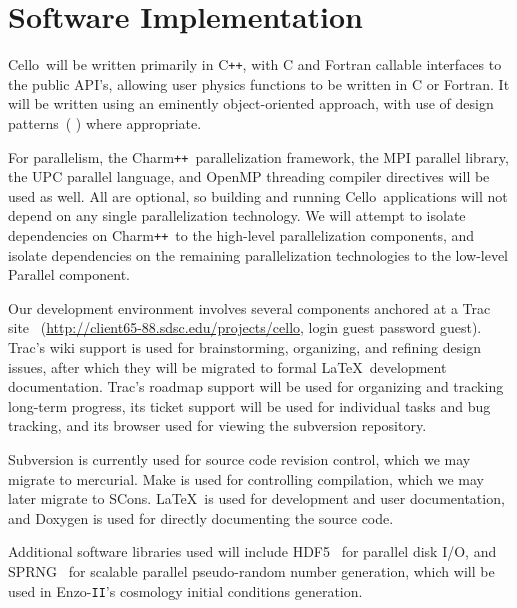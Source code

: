 \documentclass[11pt,letterpaper]{article}
\newcommand{\cello}{\textsf{Cello}}
\newcommand{\enzoii}{\textsf{Enzo}-\texttt{II}}
\newcommand{\pp}{\texttt{++}}
\newcommand{\cpp}{C\pp}
\newcommand{\charm}{\textsf{Charm\pp}}
\newcommand{\code}[1]{\textsf{#1}}
\begin{document}
\section{Software Implementation} \label{s:implementation}

\cello\ will be written primarily in \cpp, with C and Fortran callable
interfaces to the public API's, allowing user physics functions to be
written in C or Fortran.  It will be written using an eminently
object-oriented approach, with use of design patterns~(\cite{GaHe95}
\cite{BuHe07}) where appropriate.

For parallelism, the \charm\ parallelization framework, the MPI
parallel library, the UPC parallel language, and OpenMP threading
compiler directives will be used as well.  All are optional, so
building and running \cello\ applications will not depend on any
single parallelization technology.  We will attempt to isolate
dependencies on \charm\ to the high-level parallelization components,
and isolate dependencies on the remaining parallelization technologies
to the low-level \code{Parallel} component.

Our development environment involves several components anchored at a
Trac site~\cite{wwwtrac}
(\url{http://client65-88.sdsc.edu/projects/cello}, login \code{guest}
password \code{guest}).  Trac's wiki support is used for
brainstorming, organizing, and refining design issues, after which
they will be migrated to formal \LaTeX\ development documentation.
Trac's roadmap support will be used for organizing and tracking
long-term progress, its ticket support will be used for individual
tasks and bug tracking, and its browser used for viewing the
subversion repository.

Subversion is currently used for source code revision control, which
we may migrate to mercurial.  Make is used for controlling
compilation, which we may later migrate to SCons.  \LaTeX\ is used for
development and user documentation, and Doxygen is used for directly
documenting the source code.

Additional software libraries used will include HDF5~\cite{hdf5} for
parallel disk I/O, and SPRNG~\cite{wwwsprng} for scalable parallel
pseudo-random number generation, which will be used in \enzoii's
cosmology initial conditions generation.

\end{document}
